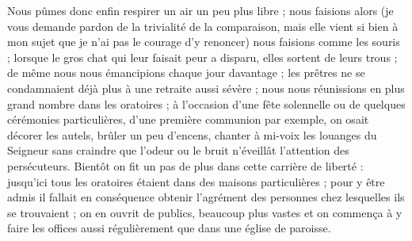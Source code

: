 Nous pûmes donc enfin respirer un air un peu plus libre ; nous faisions alors (je vous demande pardon de la trivialité de la comparaison, mais elle vient si bien à mon sujet que je n'ai pas le courage d'y renoncer)
nous faisions comme les souris ; lorsque le gros chat qui leur faisait peur a disparu, elles sortent de leurs trous ; de même nous nous émancipions chaque jour davantage ; les prêtres ne se condamnaient déjà plus à une retraite aussi sévère ; nous nous réunissions en plus grand nombre dans les oratoires ; à l'occasion d'une fête solennelle ou de quelques cérémonies particulières, d'une première communion par exemple, on osait décorer les autels, brûler un peu d'encens, chanter à mi-voix les louanges du Seigneur sans craindre que l'odeur ou le bruit n'éveillât l'attention des persécuteurs. Bientôt on fit un pas de plus dans cette carrière de liberté : jusqu'ici tous les oratoires étaient dans des maisons particulières ; pour y être admis il fallait en conséquence obtenir l'agrément des personnes chez lesquelles ils se trouvaient ; on en ouvrit de publics, beaucoup plus vastes et on commença à y faire les offices aussi régulièrement que dans une église de paroisse.

